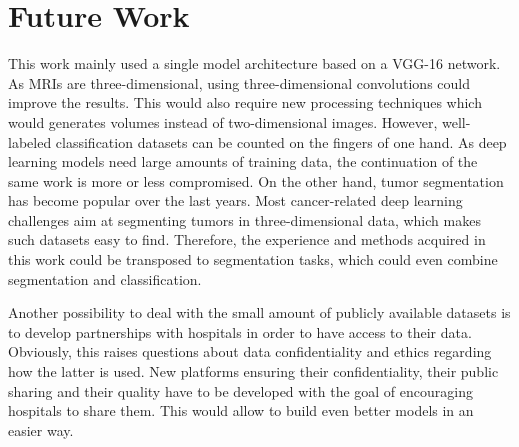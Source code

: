 \section{Future Work}
\setlength{\marginparwidth}{3cm}\leavevmode {}This work mainly used a single model architecture based on a VGG-16 network. As MRIs are three-dimensional, using three-dimensional convolutions could improve the results. This would also require new processing techniques which would generates volumes instead of two-dimensional images. However, well-labeled classification datasets can be counted on the fingers of one hand. As deep learning models need large amounts of training data, the continuation of the same work is more or less compromised. On the other hand, tumor segmentation has become popular over the last years. Most cancer-related deep learning challenges aim at segmenting tumors in three-dimensional data, which makes such datasets easy to find. Therefore, the experience and methods acquired in this work could be transposed to segmentation tasks, which could even combine segmentation and classification. 

Another possibility to deal with the small amount of publicly available datasets is to develop partnerships with hospitals in order to have access to their data. Obviously, this raises questions about data confidentiality and ethics regarding how the latter is used. New platforms ensuring their confidentiality, their public sharing and their quality have to be developed with the goal of encouraging hospitals to share them. This would allow to build even better models in an easier way.

